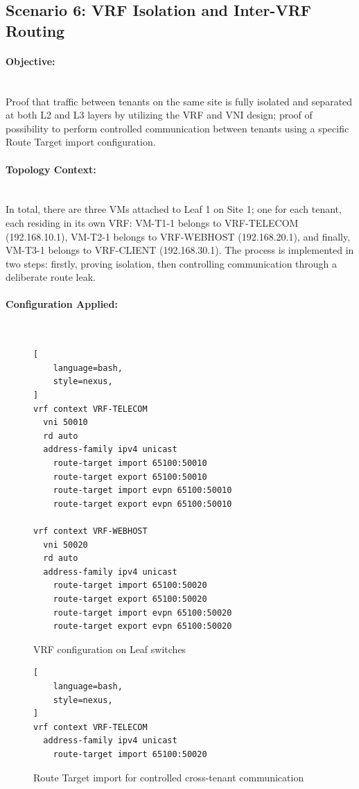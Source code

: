 \subsection{Scenario 6: VRF Isolation and Inter-VRF Routing}
\paragraph{Objective:}~\\
Proof that traffic between tenants on the same site is fully isolated and separated at both L2 and L3 layers by utilizing the VRF and VNI design; proof of possibility to perform controlled communication between tenants using a specific Route Target import configuration.

\paragraph{Topology Context:}~\\
In total, there are three VMs attached to Leaf 1 on Site 1; one for each tenant, each residing in its own VRF: VM-T1-1 belongs to VRF-TELECOM (192.168.10.1), VM-T2-1 belongs to VRF-WEBHOST (192.168.20.1), and finally, VM-T3-1 belongs to VRF-CLIENT (192.168.30.1). The process is implemented in two steps: firstly, proving isolation, then controlling communication through a deliberate route leak.

\paragraph{Configuration Applied:}~\\
\begin{figure}[!htbp]
\centering
\begin{lstlisting}[
    language=bash,
    style=nexus,
]
vrf context VRF-TELECOM
  vni 50010
  rd auto
  address-family ipv4 unicast
    route-target import 65100:50010
    route-target export 65100:50010
    route-target import evpn 65100:50010
    route-target export evpn 65100:50010

vrf context VRF-WEBHOST
  vni 50020
  rd auto
  address-family ipv4 unicast
    route-target import 65100:50020
    route-target export 65100:50020
    route-target import evpn 65100:50020
    route-target export evpn 65100:50020
\end{lstlisting}
\caption{VRF configuration on Leaf switches}
\label{fig:scenario6-vrf-config}
\end{figure}

\begin{figure}[!htbp]
\centering
\begin{lstlisting}[
    language=bash,
    style=nexus,
]
vrf context VRF-TELECOM
  address-family ipv4 unicast
    route-target import 65100:50020
\end{lstlisting}
\caption{Route Target import for controlled cross-tenant communication}
\label{fig:scenario6-route-target-import}
\end{figure}

